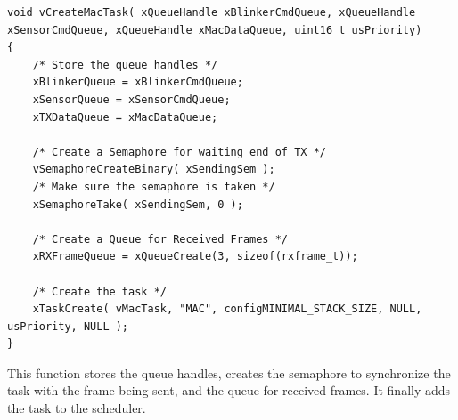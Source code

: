 \documentclass[11pt]{report}
\begin{document}
\begin{verbatim}
void vCreateMacTask( xQueueHandle xBlinkerCmdQueue, xQueueHandle xSensorCmdQueue, xQueueHandle xMacDataQueue, uint16_t usPriority)
{
    /* Store the queue handles */
    xBlinkerQueue = xBlinkerCmdQueue;
    xSensorQueue = xSensorCmdQueue;
    xTXDataQueue = xMacDataQueue;
    
    /* Create a Semaphore for waiting end of TX */
    vSemaphoreCreateBinary( xSendingSem );
    /* Make sure the semaphore is taken */
    xSemaphoreTake( xSendingSem, 0 );
    
    /* Create a Queue for Received Frames */
    xRXFrameQueue = xQueueCreate(3, sizeof(rxframe_t));
    
    /* Create the task */
    xTaskCreate( vMacTask, "MAC", configMINIMAL_STACK_SIZE, NULL, usPriority, NULL );
}
\end{verbatim}
This function stores the queue handles, creates the semaphore to synchronize the task with the frame being sent, and the queue for received frames. It finally adds the task to the scheduler.
\end{document}

